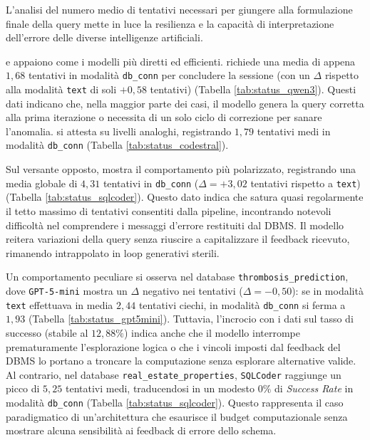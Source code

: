 L'analisi del numero medio di tentativi necessari per giungere alla
formulazione finale della query mette in luce la resilienza e la
capacità di interpretazione dell'errore delle diverse intelligenze
artificiali.

 e  appaiono come i modelli
più diretti ed efficienti.  richiede una media
di appena \(1,68\) tentativi in modalità \texttt{db\_conn} per
concludere la sessione (con un \(\Delta\) rispetto alla modalità
\texttt{text} di soli \(+0,58\) tentativi) (Tabella \ref{tab:status_qwen3}). Questi dati indicano
che, nella maggior parte dei casi, il modello genera la query corretta
alla prima iterazione o necessita di un solo ciclo di correzione per
sanare l'anomalia.  si attesta su livelli analoghi,
registrando \(1,79\) tentativi medi in modalità \texttt{db\_conn}
(Tabella \ref{tab:status_codestral}).

Sul versante opposto,  mostra il comportamento più
polarizzato, registrando una media globale di \(4,31\) tentativi in
\texttt{db\_conn} (\(\Delta = +3,02\) tentativi rispetto a
\texttt{text}) (Tabella \ref{tab:status_sqlcoder}). Questo dato indica che 
satura quasi regolarmente il tetto massimo di tentativi consentiti
dalla pipeline, incontrando notevoli difficoltà nel comprendere i
messaggi d'errore restituiti dal DBMS. Il modello reitera variazioni
della query senza riuscire a capitalizzare il feedback ricevuto,
rimanendo intrappolato in loop generativi sterili.

Un comportamento peculiare si osserva nel database
\texttt{thrombosis\_prediction}, dove \texttt{GPT-5-mini} mostra un
\(\Delta\) negativo nei tentativi (\(\Delta = -0,50\)): se in modalità
\texttt{text} effettuava in media \(2,44\) tentativi ciechi, in modalità
\texttt{db\_conn} si ferma a \(1,93\) (Tabella \ref{tab:status_gpt5mini}). Tuttavia,
l'incrocio con i dati sul tasso di successo (stabile al \(12,88\%\))
indica anche che il modello interrompe prematuramente l'esplorazione logica o
che i vincoli imposti dal feedback del DBMS lo portano a troncare la
computazione senza esplorare alternative valide. Al contrario, nel
database \texttt{real\_estate\_properties}, \texttt{SQLCoder} raggiunge
un picco di \(5,25\) tentativi medi, traducendosi in un modesto
\(0\%\) di \emph{Success Rate} in modalità \texttt{db\_conn} (Tabella
\ref{tab:status_sqlcoder}). Questo rappresenta il caso paradigmatico di un'architettura che
esaurisce il budget computazionale senza mostrare alcuna sensibilità ai
feedback di errore dello schema.

